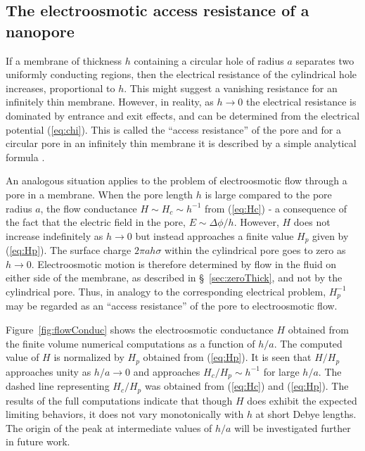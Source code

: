 \subsection{The electroosmotic access resistance of a nanopore}
If a membrane of thickness $h$ containing a circular hole of radius $a$ separates two uniformly conducting regions, then the electrical resistance of the cylindrical hole increases,
proportional to $h$. This might suggest a vanishing resistance for an infinitely thin membrane. However, in reality, as $h\rightarrow 0$ the electrical resistance is dominated by entrance and exit effects,
and can be determined from the electrical potential (\ref{eq:chi}). This is called the ``access resistance'' of the pore and for a circular pore in an infinitely thin membrane it is described by a simple analytical formula \cite{Hall1975}.

An analogous situation applies to the problem of electroosmotic flow through a pore in a membrane. When the pore length $h$ is large compared to the pore radius $a$, the flow conductance $H \sim H_c \sim h^{-1}$ from (\ref{eq:Hc}) - a consequence of the fact that the electric field in the pore, $E \sim \Delta \phi / h$. However, $H$ does not increase indefinitely as $h \rightarrow 0$ but instead approaches a finite value $H_p$ given by (\ref{eq:Hp}). The surface charge $2\pi ah\sigma$ within the cylindrical pore goes to zero as $h\rightarrow 0$. Electroosmotic motion is therefore determined by
flow in the fluid on either side of the membrane, as described in \S~\ref{sec:zeroThick}, and not by the cylindrical pore. Thus, in analogy to the corresponding electrical problem, $H_p^{-1}$ may be regarded as an  ``access resistance'' of the pore to electroosmotic flow.

Figure~\ref{fig:flowConduc} shows the electroosmotic conductance $H$ obtained from 
the finite volume numerical computations as a function of  $h/a$. The computed value of $H$ is normalized by $H_p$ obtained from (\ref{eq:Hp}). It is seen that $H/H_p$ approaches unity as $h/a \rightarrow 0$ and approaches $H_c/H_p \sim h^{-1}$ for large $h/a$. The dashed line representing $H_c/H_p$ was obtained from (\ref{eq:Hc}) and (\ref{eq:Hp}). The results of the full computations indicate that though $H$ does exhibit the expected limiting behaviors, it does not vary monotonically with $h$ at short Debye lengths. The origin of the peak at intermediate values of $h/a$ will be investigated further in future work.

